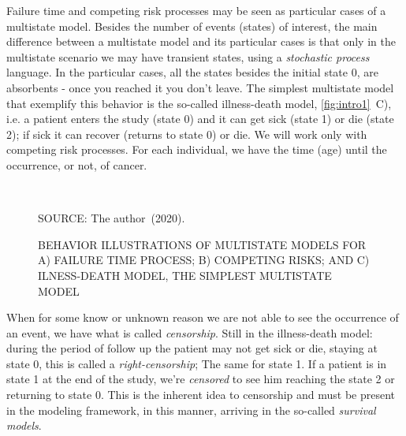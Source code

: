 Failure time and competing risk processes may be seen as particular
cases of a multistate model. Besides the number of events (states) of
interest, the main difference between a multistate model and its
particular cases is that only in the multistate scenario we may have
transient states, using a \textit{stochastic process} language. In the
particular cases, all the states besides the initial state 0, are
absorbents - once you reached it you don't leave. The simplest
multistate model that exemplify this behavior is the so-called
illness-death model, \autoref{fig:intro1}~C), i.e. a patient enters the
study (state 0) and it can get sick (state 1) or die (state 2); if sick
it can recover (returns to state 0) or die. We will work only with
competing risk processes. For each individual, we have the time (age)
until the occurrence, or not, of cancer.

\begin{figure}[H]
  \setlength{\abovecaptionskip}{.0001pt}
  \caption{BEHAVIOR ILLUSTRATIONS OF MULTISTATE MODELS FOR A) FAILURE
    TIME PROCESS; B) COMPETING RISKS; AND C) ILNESS-DEATH MODEL, THE
    SIMPLEST MULTISTATE MODEL}
  \vspace{0.425cm} \centering
  \\
  \vspace{0.45cm}
  \begin{footnotesize}
    SOURCE: The author~(2020).
  \end{footnotesize}
  \label{fig:intro1}
\end{figure}

When for some know or unknown reason we are not able to see the
occurrence of an event, we have what is called \textit{censorship}.
Still in the illness-death model: during the period of follow up the
patient may not get sick or die, staying at state 0, this is called a
\textit{right-censorship}; The same for state 1. If a patient is in
state 1 at the end of the study, we're \textit{censored} to see him
reaching the state 2 or returning to state 0. This is the inherent idea
to censorship and must be present in the modeling framework, in this
manner, arriving in the so-called \textit{survival models}.


